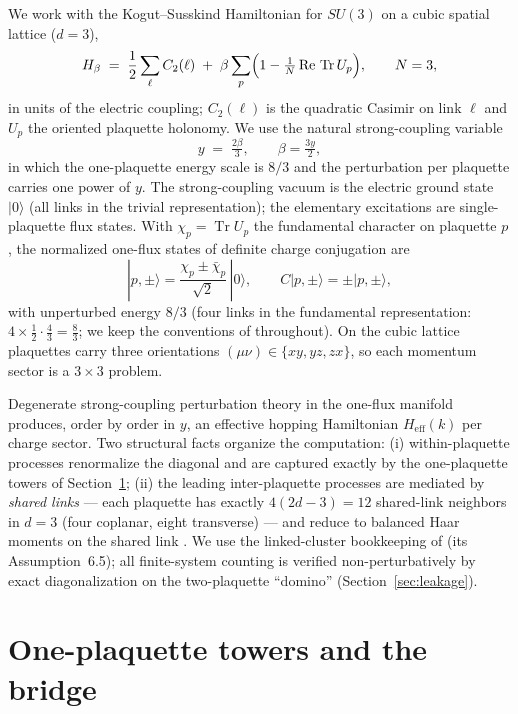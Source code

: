 \documentclass[11pt]{article}
\newcommand{\Tr}{\operatorname{Tr}}
\newcommand{\ket}[1]{|#1\rangle}
\begin{document}
We work with the Kogut--Susskind Hamiltonian \cite{KogutSusskind1975} for
$SU(3)$ on a cubic spatial lattice ($d=3$),
\begin{equation}
H_\beta \;=\; \frac12\sum_{\ell} C_2(\ell)\;+\;\beta\sum_{p}
\Bigl(1-\tfrac1N\,\mathrm{Re}\,\Tr U_p\Bigr),\qquad N=3,
\label{eq:H}
\end{equation}
in units of the electric coupling; $C_2(\ell)$ is the quadratic Casimir on
link $\ell$ and $U_p$ the oriented plaquette holonomy. We use the natural
strong-coupling variable
\begin{equation}
y \;=\; \tfrac{2\beta}{3}, \qquad \beta=\tfrac{3y}{2},
\end{equation}
in which the one-plaquette energy scale is $8/3$ and the perturbation per
plaquette carries one power of $y$. The strong-coupling vacuum is the
electric ground state $\ket{0}$ (all links in the trivial representation);
the elementary excitations are single-plaquette flux states. With
$\chi_p=\Tr U_p$ the fundamental character on plaquette $p$, the normalized
one-flux states of definite charge conjugation are
\begin{equation}
\ket{p,\pm}=\frac{\chi_p\pm\bar\chi_p}{\sqrt2}\,\ket{0},
\qquad C\ket{p,\pm}=\pm\ket{p,\pm},
\end{equation}
with unperturbed energy $8/3$ (four links in the fundamental representation:
$4\times\tfrac12\cdot\tfrac43=\tfrac83$; we keep the conventions of
\cite{companion} throughout). On the cubic lattice plaquettes carry three
orientations $(\mu\nu)\in\{xy,yz,zx\}$, so each momentum sector is a
$3\times3$ problem.

Degenerate strong-coupling perturbation theory in the one-flux manifold
produces, order by order in $y$, an effective hopping Hamiltonian
$H_{\mathrm{eff}}(k)$ per charge sector. Two structural facts organize the
computation: (i) within-plaquette processes renormalize the diagonal and are
captured exactly by the one-plaquette towers of Section~\ref{sec:towers};
(ii) the leading inter-plaquette processes are mediated by \emph{shared
links} --- each plaquette has exactly $4(2d-3)=12$ shared-link neighbors in
$d=3$ (four coplanar, eight transverse) --- and reduce to balanced Haar
moments on the shared link \cite{companion}. We use the linked-cluster
bookkeeping of \cite{companion} (its Assumption~6.5); all finite-system
counting is verified non-perturbatively by exact diagonalization on the
two-plaquette ``domino'' (Section~\ref{sec:leakage}).

\section{One-plaquette towers and the bridge}
\label{sec:towers}
\end{document}
